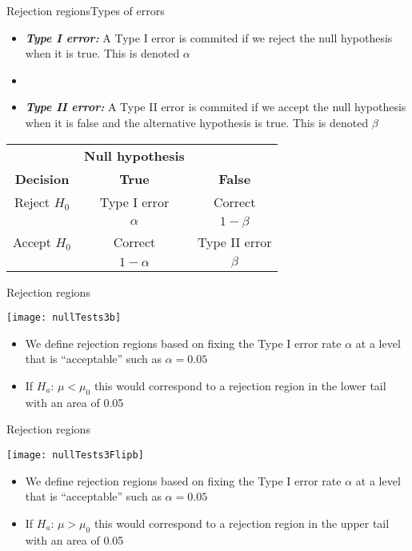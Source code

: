 \documentclass[xcolor=dvipsnames]{beamer}
\begin{document}
\begin{frame}{Rejection regions}{Types of errors}
	\begin{itemize}
		\item \textbf{\emph{Type I error:}} A Type I error is commited if we reject the null hypothesis when it is true. This is denoted $\alpha$  \pause
		\item[]
		\item \textbf{\emph{Type II error:}} A Type II error is commited if we accept the null hypothesis when it is false and the alternative hypothesis is true. This is denoted $\beta$  \pause
	\end{itemize}
\begin{center}
	\begin{tabular}{c|cc}
		& \textbf{Null hypothesis} & \\
		\textbf{Decision} & \textbf{True} & \textbf{False} \\ \hline
		Reject $H_0$ & Type I error & Correct \\
		& $\alpha$ & $1-\beta$ \\ \hline
		Accept $H_0$ & Correct & Type II error \\
		& $1-\alpha$ & $\beta$ \\ \hline
	\end{tabular}
\end{center}
\end{frame}

\begin{frame}{Rejection regions}
	\begin{center}
				\texttt{[image: nullTests3b]}
	\end{center}
\begin{itemize}
	\item We define rejection regions based on fixing the Type I error rate $\alpha$ at a level that is ``acceptable'' such as $\alpha = 0.05$  \pause
	\item If $H_a$: $\mu < \mu_0$ this would correspond to a rejection region in the lower tail with an area of 0.05
\end{itemize}
\end{frame}

\begin{frame}{Rejection regions}
	\begin{center}
		\texttt{[image: nullTests3Flipb]}
	\end{center}
	\begin{itemize}
		\item We define rejection regions based on fixing the Type I error rate $\alpha$ at a level that is ``acceptable'' such as $\alpha = 0.05$  \pause
		\item If $H_a$: $\mu > \mu_0$ this would correspond to a rejection region in the upper tail with an area of 0.05
	\end{itemize}
\end{frame}
\end{document}

